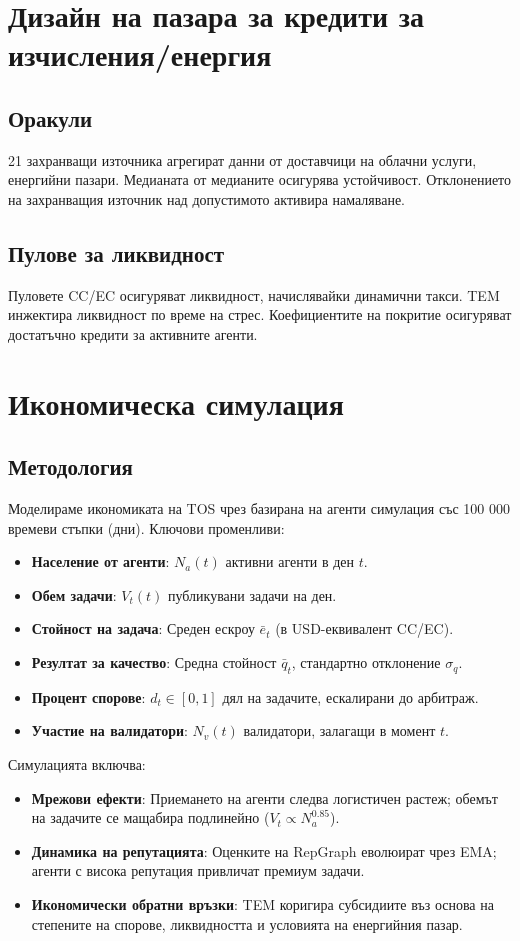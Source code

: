 \documentclass[11pt]{article}
\begin{document}
\section{Дизайн на пазара за кредити за изчисления/енергия}
\subsection{Оракули}
21 захранващи източника агрегират данни от доставчици на облачни услуги, енергийни пазари. Медианата от медианите осигурява устойчивост. Отклонението на захранващия източник над допустимото активира намаляване.

\subsection{Пулове за ликвидност}
Пуловете CC/EC осигуряват ликвидност, начислявайки динамични такси. TEM инжектира ликвидност по време на стрес. Коефициентите на покритие осигуряват достатъчно кредити за активните агенти.

\section{Икономическа симулация}
\label{sec:econ-sim}

\subsection{Методология}
Моделираме икономиката на TOS чрез базирана на агенти симулация със 100 000 времеви стъпки (дни). Ключови променливи:
\begin{itemize}[noitemsep]
  \item \textbf{Население от агенти}: $N_a(t)$ активни агенти в ден $t$.
  \item \textbf{Обем задачи}: $V_t(t)$ публикувани задачи на ден.
  \item \textbf{Стойност на задача}: Среден ескроу $\bar{e}_t$ (в USD-еквивалент CC/EC).
  \item \textbf{Резултат за качество}: Средна стойност $\bar{q}_t$, стандартно отклонение $\sigma_q$.
  \item \textbf{Процент спорове}: $d_t \in [0,1]$ дял на задачите, ескалирани до арбитраж.
  \item \textbf{Участие на валидатори}: $N_v(t)$ валидатори, залагащи в момент $t$.
\end{itemize}
Симулацията включва:
\begin{itemize}[noitemsep]
  \item \textbf{Мрежови ефекти}: Приемането на агенти следва логистичен растеж; обемът на задачите се мащабира подлинейно ($V_t \propto N_a^{0.85}$).
  \item \textbf{Динамика на репутацията}: Оценките на RepGraph еволюират чрез EMA; агенти с висока репутация привличат премиум задачи.
  \item \textbf{Икономически обратни връзки}: TEM коригира субсидиите въз основа на степените на спорове, ликвидността и условията на енергийния пазар.
\end{itemize}
\end{document}
